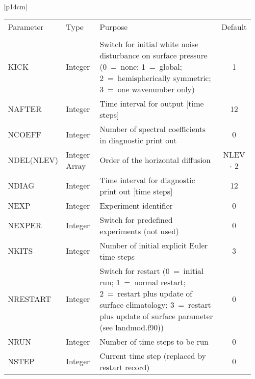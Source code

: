 \begin{center}
\begin{tabular}{|p{14cm}|}
\begin{center}
\begin{tabular}{l l p{5cm} c}  %
Parameter & Type & Purpose & Default \\
&&&\\
KICK & Integer & Switch for initial white noise disturbance on surface pressure (0~=~none;
1~=~global; 2~=~hemispherically symmetric; 3~=~one wavenumber only) & 1 \\
NAFTER & Integer &Time interval for output [time steps] & 12 \\
NCOEFF & Integer &Number of spectral coefficients in diagnostic print out & 0 \\
NDEL(NLEV)  & Integer Array & Order of the horizontal diffusion & NLEV $\cdot$ 2 \\
NDIAG & Integer & Time interval for diagnostic print out [time steps] & 12\\
NEXP & Integer & Experiment identifier & 0 \\
NEXPER & Integer & Switch for predefined experiments (not used) & 0 \\
NKITS & Integer & Number of initial explicit Euler time steps & 3 \\
NRESTART & Integer & Switch for restart (0~=~initial run;  1~=~normal restart;
2~=~restart plus update of surface climatology; 3~=~restart plus update of surface parameter
(see {\module landmod.f90})) & 0 \\
NRUN & Integer & Number of time steps to be run & 0 \\
NSTEP & Integer & Current time step (replaced by restart record) & 0 \\
\end{tabular}
\end{center}
\end{tabular}
\end{center}

\newpage 

